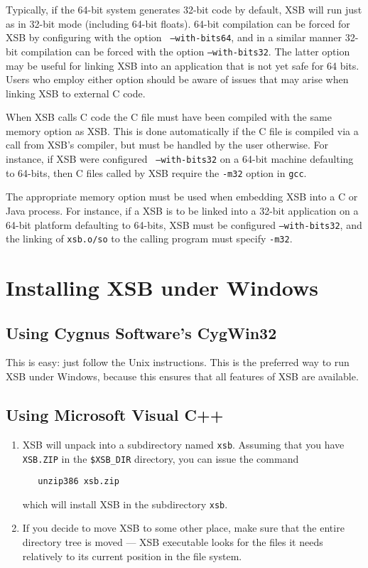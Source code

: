 Typically, if the 64-bit system generates 32-bit code by default, XSB
will run just as in 32-bit mode (including 64-bit floats).  64-bit
compilation can be forced for XSB by configuring with the option {\tt
  --with-bits64}, and in a similar manner 32-bit compilation can be
forced with the option {\tt --with-bits32}.  The latter option may be
useful for linking XSB into an application that is not yet safe for 64
bits.  Users who employ either option should be aware of issues that
may arise when linking XSB to external C code.
\bi
\item When XSB calls C code the C file must have been compiled with
  the same memory option as XSB.  This is done automatically if the C
  file is compiled via a call from XSB's compiler, but must be handled
  by the user otherwise.  For instance, if XSB were configured {\tt
    --with-bits32} on a 64-bit machine defaulting to 64-bits, then C
  files called by XSB require the {\tt -m32} option in {\tt gcc}.
\item The appropriate memory option must be used when embedding XSB
  into a C or Java process.  For instance, if a XSB is to be linked
  into a 32-bit application on a 64-bit platform defaulting to
  64-bits, XSB must be configured {\tt --with-bits32}, and the linking
  of {\tt xsb.o/so} to the calling program must specify {\tt -m32}.
  \ei

\section{Installing XSB under Windows}
\subsection{Using Cygnus Software's \mbox{CygWin32}}
\label{quick:cygwin}

This is easy: just follow the Unix instructions. This is the preferred way to
run XSB under Windows, because this ensures that all features of XSB are
available.


\subsection{Using Microsoft Visual C++}
\label{quick:DOS}

\begin{enumerate}
\item 
   XSB will unpack into a subdirectory named {\tt xsb}.
   Assuming that you have {\tt XSB.ZIP} in the {\tt \$XSB\_DIR} directory,
   you can issue the command
\begin{verbatim}
   unzip386 xsb.zip
\end{verbatim}
   which will install XSB in the subdirectory {\tt xsb}.

 \item If you decide to move XSB to some other place, make sure that the
   entire directory tree is moved --- XSB executable looks for the files it
   needs relatively to its current position in the file system.

\end{enumerate}


